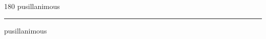 
\begin{frame}
\begin{center}
\begin{turn}{180}
{\fontsize{2.5cm}{1em}\selectfont pusillanimous}
\end{turn}
\vspace{1em}\par  
\hrule
\vspace{1em}\par  
{\fontsize{2.5cm}{1em}\selectfont pusillanimous}
\end{center}
\end{frame}
